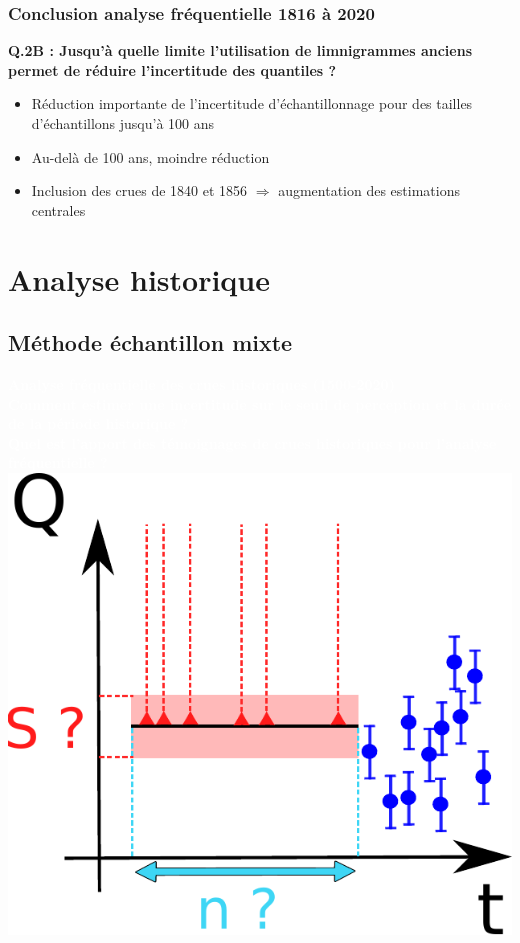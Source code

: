 \documentclass[compress,9pt]{beamer}
\begin{document}
	\begin{frame}[t]
		\frametitle{Conclusion analyse fréquentielle 1816 à 2020}
		\vfill
		\centering
		\large{\textbf{Q.2B : Jusqu'à quelle limite l'utilisation de limnigrammes anciens permet de réduire l'incertitude des quantiles ?}}
		\vspace{10pt}
		\begin{itemize}
		\normalsize
			\item<2->[$\vartriangleright$] Réduction importante de l'incertitude d'échantillonnage pour des tailles d'échantillons jusqu'à 100 ans
			\vspace{10pt}
			\item<3->[$\vartriangleright$] Au-delà de 100 ans, moindre réduction
			\vspace{10pt}
			\item<4->[$\vartriangleright$] Inclusion des crues de 1840 et 1856 $\Rightarrow$ augmentation des estimations centrales
		\end{itemize}		
	\end{frame}

\section{Analyse historique}
	\subsection{Méthode échantillon mixte}
	{
    \begin{frame}
        \begin{center}
        	\vfill
        	\textcolor{white}{\Large \textbf{Analyse fréquentielle des crues historiques (1500-2020)}}\\
		\vfill
		\textcolor{white}{\large \textbf{Comment estimer une incertitude sur le seuil de perception et la durée de la
période historique ?\\ 
		\vspace{0.5cm}
		Quel est l'apport des témoignages de crues historiques pour l'analyse fréquentielle ?
		}}
		\vfill
		\includegraphics[width = .3\textwidth]{./Figures/uSuN.pdf}
        \end{center}
    \end{frame}
    }
\end{document}
